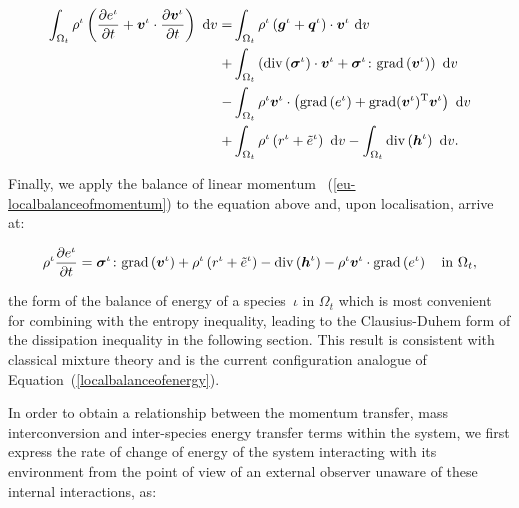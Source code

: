 \begin{equation*}
\begin{split}
\int_{\Omega_{t}} \rho^{\iota} \left(\frac{\partial
  e^{\iota}}{\partial t} + \mbox{\boldmath$ v$}^{\iota}\cdot\frac{\partial
  \mbox{\boldmath$ v$}^{\iota}}{\partial t}\right)\ \mathrm{d}v = & \int_{\Omega_{t}}
\rho^{\iota} \left(\mbox{\boldmath$ g$}^{\iota} +
\mbox{\boldmath$ q$}^{\iota}\right)\cdot\mbox{\boldmath$ v$}^{\iota}\ \mathrm{d}v\\ + &
\int_{\Omega_{t}}
\left(\mathrm{div}\left(\mbox{\boldmath$\sigma$}^{\iota}\right)\cdot\mbox{\boldmath$ v$}^{\iota} +
\mbox{\boldmath$\sigma$}^{\iota}\colon\mathrm{grad}\left(\mbox{\boldmath$ v$}^{\iota}\right)
\right)\ \mathrm{d}v\\ - & \int_{\Omega_{t}} \rho^{\iota}\mbox{\boldmath$ v$}^{\iota}
\cdot \left(\mathrm{grad}\left(e^{\iota}\right)
+\mathrm{grad}(\mbox{\boldmath$ v$}^{\iota})^{\mathrm{T}}
\mbox{\boldmath$ v$}^{\iota}\right)\ \mathrm{d}v \\ + &\int_{\Omega_{t}} \rho^{\iota}
\left(r^{\iota} + \tilde{e}^{\iota} \right)\ \mathrm{d}v -
\int_{\Omega_{t}} \mathrm{div}\left(\mbox{\boldmath$ h$}^{\iota}\right)\ \mathrm{d}v.
\end{split}
\end{equation*}

\noindent Finally, we apply the balance of linear momentum~%
(\ref{eu-localbalanceofmomentum}) to the equation above and, upon
localisation, arrive at:

\begin{equation}
\rho^{\iota} \frac{\partial e^{\iota}}{\partial t} =
\mbox{\boldmath$\sigma$}^{\iota}\colon\mathrm{grad}\left(\mbox{\boldmath$ v$}^{\iota}\right) +
\rho^{\iota} \left(r^{\iota} + \tilde{e}^{\iota} \right) -
\mathrm{div}\left(\mbox{\boldmath$ h$}^{\iota}\right) - \rho^{\iota}\mbox{\boldmath$ v$}^{\iota} \cdot
\mathrm{grad} \left(e^{\iota}\right) \quad
\mathrm{in}\ \Omega_{t},
\label{eu-localbalanceofenergy}
\end{equation}

\noindent the form of the balance of energy of a species~$\iota$ in
$\Omega_{t}$ which is most convenient for combining with the entropy
inequality, leading to the Clausius-Duhem form of the dissipation
inequality in the following section.  This result is consistent with
classical mixture theory \citep{TruesdellToupin:60} and is the current
configuration analogue of Equation~(\ref{localbalanceofenergy}).

In order to obtain a relationship between the momentum transfer, mass
interconversion and inter-species energy transfer terms within the
system, we first express the rate of change of energy of the system
interacting with its environment from the point of view of an external
observer unaware of these internal interactions, as:

